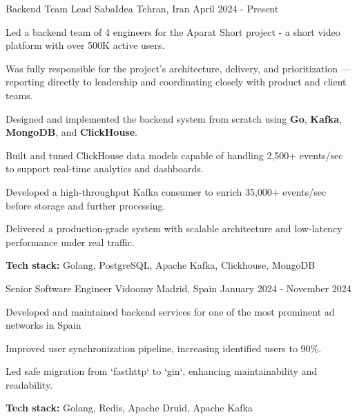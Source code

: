 

\begin{cventries}


  \cventry
    {Backend Team Lead} %
    {SabaIdea} %
    {Tehran, Iran} %
    {April 2024 - Present} %
    {
      \begin{cvitems} %
        \item Led a backend team of 4 engineers for the Aparat Short project - a short video platform with over 500K active users.
        \item Was fully responsible for the project’s architecture, delivery, and prioritization — reporting directly to leadership and coordinating closely with product and client teams.
        \item Designed and implemented the backend system from scratch using \textbf{Go}, \textbf{Kafka}, \textbf{MongoDB}, and \textbf{ClickHouse}.
        \item Built and tuned ClickHouse data models capable of handling 2,500+ events/sec to support real-time analytics and dashboards.
        \item Developed a high-throughput Kafka consumer to enrich 35,000+ events/sec before storage and further processing.
        \item Delivered a production-grade system with scalable architecture and low-latency performance under real traffic.
        \item \textbf{Tech stack:} Golang, PostgreSQL, Apache Kafka, Clickhouse, MongoDB
      \end{cvitems}
    }

    
  \cventry
    {Senior Software Engineer} %
    {Vidoomy} %
    {Madrid, Spain} %
    {January 2024 - November 2024} %
    {
      \begin{cvitems} %
        \item Developed and maintained backend services for one of the most prominent ad networks in Spain
        \item Improved user synchronization pipeline, increasing identified users to 90\%.
        \item Led safe migration from `fasthttp` to `gin`, enhancing maintainability and readability.
        \item \textbf{Tech stack:} Golang, Redis, Apache Druid, Apache Kafka
      \end{cvitems}
    }


\end{cventries}
